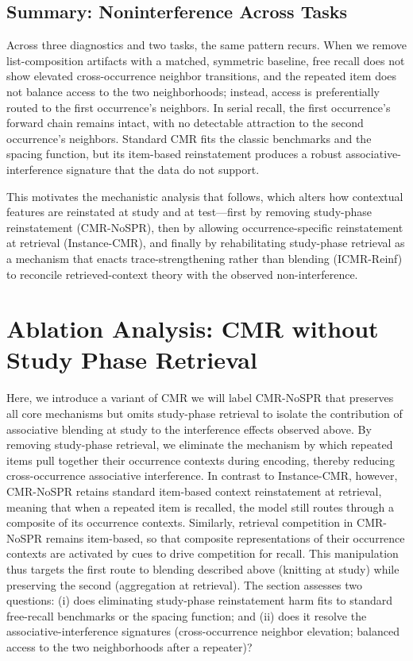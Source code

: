 \documentclass[
  man,
  floatsintext,
  longtable,
  nolmodern,
  notxfonts,
  notimes,
  draftfirst,
  colorlinks=true,linkcolor=blue,citecolor=blue,urlcolor=blue]{apa7}
\begin{document}
\subsection{Summary: Noninterference Across
Tasks}\label{summary-noninterference-across-tasks}

Across three diagnostics and two tasks, the same pattern recurs. When we
remove list-composition artifacts with a matched, symmetric baseline,
free recall does not show elevated cross-occurrence neighbor
transitions, and the repeated item does not balance access to the two
neighborhoods; instead, access is preferentially routed to the first
occurrence's neighbors. In serial recall, the first occurrence's forward
chain remains intact, with no detectable attraction to the second
occurrence's neighbors. Standard CMR fits the classic benchmarks and the
spacing function, but its item-based reinstatement produces a robust
associative-interference signature that the data do not support.

This motivates the mechanistic analysis that follows, which alters how
contextual features are reinstated at study and at test---first by
removing study-phase reinstatement (CMR-NoSPR), then by allowing
occurrence-specific reinstatement at retrieval (Instance-CMR), and
finally by rehabilitating study-phase retrieval as a mechanism that
enacts trace-strengthening rather than blending (ICMR-Reinf) to
reconcile retrieved-context theory with the observed non-interference.

\section{Ablation Analysis: CMR without Study Phase
Retrieval}\label{ablation-analysis-cmr-without-study-phase-retrieval}

Here, we introduce a variant of CMR we will label CMR-NoSPR that
preserves all core mechanisms but omits study-phase retrieval to isolate
the contribution of associative blending at study to the interference
effects observed above. By removing study-phase retrieval, we eliminate
the mechanism by which repeated items pull together their occurrence
contexts during encoding, thereby reducing cross-occurrence associative
interference. In contrast to Instance-CMR, however, CMR-NoSPR retains
standard item-based context reinstatement at retrieval, meaning that
when a repeated item is recalled, the model still routes through a
composite of its occurrence contexts. Similarly, retrieval competition
in CMR-NoSPR remains item-based, so that composite representations of
their occurrence contexts are activated by cues to drive competition for
recall. This manipulation thus targets the first route to blending
described above (knitting at study) while preserving the second
(aggregation at retrieval). The section assesses two questions: (i) does
eliminating study-phase reinstatement harm fits to standard free-recall
benchmarks or the spacing function; and (ii) does it resolve the
associative-interference signatures (cross-occurrence neighbor
elevation; balanced access to the two neighborhoods after a repeater)?
\end{document}
